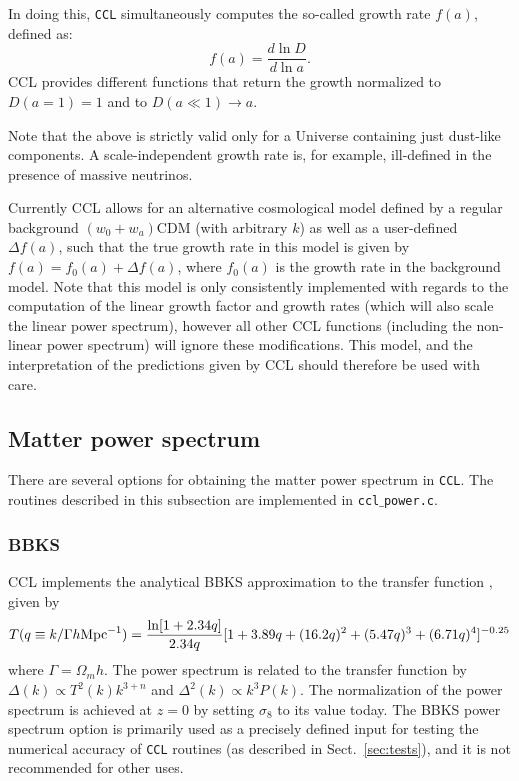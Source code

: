 \documentclass[\docopts]{\docclass}
\begin{document}
In doing this, {\tt CCL} simultaneously computes the so-called growth rate $f(a)$, defined as:
\begin{equation}
  f(a)=\frac{d\ln D}{d\ln a}.
\end{equation}
CCL provides different functions that return the growth normalized to $D(a=1)=1$ and to $D(a\ll1)\rightarrow a$.

Note that the above is strictly valid only for a Universe containing just dust-like components. A scale-independent growth rate is, for example, ill-defined in the presence of massive neutrinos.

Currently CCL allows for an alternative cosmological model defined by a regular background $(w_0+w_a)$CDM (with arbitrary $k$) as well as a user-defined $\Delta f(a)$, such that the true growth rate in this model is given by $f(a)=f_0(a)+\Delta f(a)$, where $f_0(a)$ is the growth rate in the background model. Note that this model is only consistently implemented with regards to the computation of the linear growth factor and growth rates (which will also scale the linear power spectrum), however all other CCL functions (including the non-linear power spectrum) will ignore these modifications. This model, and the interpretation of the predictions given by CCL should therefore be used with care.

\subsection{Matter power spectrum}
\label{sec:power}

There are several options for obtaining the matter power spectrum in {\tt CCL}.
The routines described in this subsection are implemented in {\tt ccl$\_$power.c}.

\subsubsection{BBKS}
CCL implements the analytical BBKS approximation to the transfer function \citep{BBKS}, given by
\begin{equation}
T(q\equiv k/\Gamma h {\rm Mpc}^{-1}) = \frac{\ln[1+2.34q]}{2.34q}[1+3.89q+(16.2q)^2+(5.47q)^3+(6.71q)^4]^{-0.25}
\end{equation}
where $\Gamma = \Omega_m h$.
The power spectrum is related to the transfer function by $\Delta(k)\propto T^2(k)k^{3+n}$ and $\Delta^2(k)\propto k^3P(k)$. The normalization of the power spectrum is achieved at $z=0$ by setting $\sigma_8$ to its value today.
The BBKS power spectrum option is primarily used as a precisely defined input for testing the numerical accuracy of {\tt CCL} routines (as described in Sect.~\ref{sec:tests}), and it is not recommended for other uses.
\end{document}
